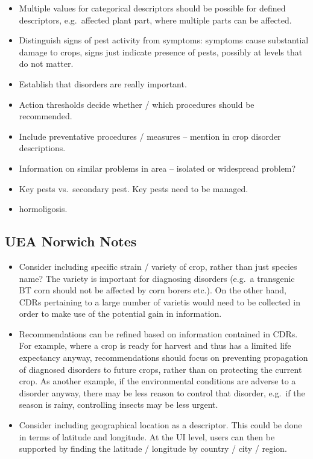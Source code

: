 \documentclass[a4paper,fleqn]{article}
\begin{document}
\begin{itemize}
\item Multiple values for categorical descriptors should be possible
  for defined descriptors, e.g.\ affected plant part, where multiple
  parts can be affected.

\item Distinguish signs of pest activity from symptoms: symptoms cause
  substantial damage to crops, signs just indicate presence of pests,
  possibly at levels that do not matter.

\item Establish that disorders are really important.

\item Action thresholds decide whether / which procedures should be
  recommended.

\item Include preventative procedures / measures -- mention in crop
  disorder descriptions.

\item Information on similar problems in area -- isolated or
  widespread problem?

\item Key pests vs.\ secondary pest. Key pests need to be managed.

\item hormoligosis.

\end{itemize}


\subsection{UEA Norwich Notes}

\begin{itemize}

\item Consider including specific strain / variety of crop, rather
  than just species name? The variety is important for diagnosing
  disorders (e.g.\ a transgenic BT corn should not be affected by corn
  borers etc.). On the other hand, CDRs pertaining to a large number
  of varietis would need to be collected in order to make use of the
  potential gain in information.

\item Recommendations can be refined based on information contained in
  CDRs. For example, where a crop is ready for harvest and thus has a
  limited life expectancy anyway, recommendations should focus on
  preventing propagation of diagnosed disorders to future crops,
  rather than on protecting the current crop. As another example, if
  the environmental conditions are adverse to a disorder anyway, there
  may be less reason to control that disorder, e.g.\ if the season is
  rainy, controlling insects may be less urgent.

\item Consider including geographical location as a descriptor. This
  could be done in terms of latitude and longitude. At the UI level,
  users can then be supported by finding the latitude / longitude by
  country / city / region.

\end{itemize}
\end{document}
